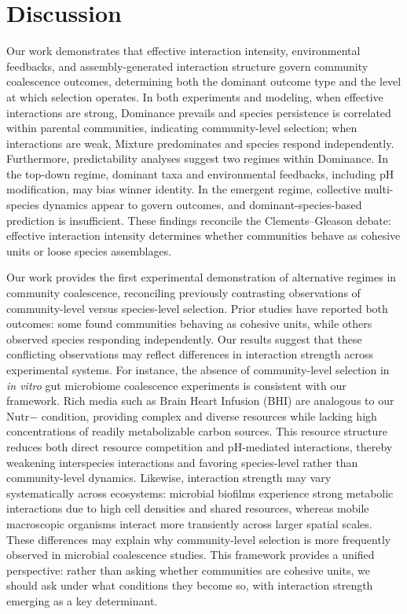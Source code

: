 \section{Discussion}
\label{sec:discussion}


Our work demonstrates that effective interaction intensity, environmental feedbacks, and assembly-generated interaction structure govern community coalescence outcomes, determining both the dominant outcome type and the level at which selection operates. In both experiments and modeling, when effective interactions are strong, Dominance prevails and species persistence is correlated within parental communities, indicating community-level selection; when interactions are weak, Mixture predominates and species respond independently. Furthermore, predictability analyses suggest two regimes within Dominance. In the top-down regime, dominant taxa and environmental feedbacks, including pH modification, may bias winner identity. In the emergent regime, collective multi-species dynamics appear to govern outcomes, and dominant-species-based prediction is insufficient. These findings reconcile the Clements--Gleason debate: effective interaction intensity determines whether communities behave as cohesive units or loose species assemblages.

Our work provides the first experimental demonstration of alternative regimes in community coalescence, reconciling previously contrasting observations of community-level versus species-level selection. Prior studies have reported both outcomes: some found communities behaving as cohesive units\citep{Tikhonov2016, DiazColunga2022}, while others observed species responding independently\citep{VanderGucht2007, Vermeij1991}. Our results suggest that these conflicting observations may reflect differences in interaction strength across experimental systems. For instance, the absence of community-level selection in \textit{in vitro} gut microbiome coalescence experiments\citep{Goldman2025, Walton2025} is consistent with our framework. Rich media such as Brain Heart Infusion (BHI) are analogous to our Nutr$-$ condition, providing complex and diverse resources while lacking high concentrations of readily metabolizable carbon sources. This resource structure reduces both direct resource competition and pH-mediated interactions, thereby weakening interspecies interactions\citep{Ratzke2020} and favoring species-level rather than community-level dynamics. Likewise, interaction strength may vary systematically across ecosystems: microbial biofilms experience strong metabolic interactions due to high cell densities and shared resources\citep{Nadell2016}, whereas mobile macroscopic organisms interact more transiently across larger spatial scales. These differences may explain why community-level selection is more frequently observed in microbial coalescence studies. This framework provides a unified perspective: rather than asking whether communities are cohesive units, we should ask under what conditions they become so, with interaction strength emerging as a key determinant.


